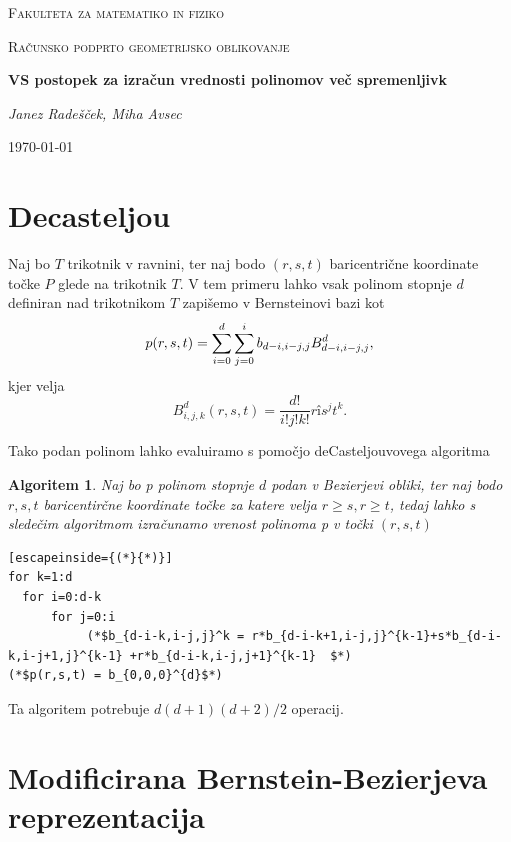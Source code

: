 \documentclass{article}
\newtheorem{algoritm}{Algoritem}[section]
\begin{document}
\begin{titlepage}
	\centering
	{\scshape\LARGE Fakulteta za matematiko in fiziko \par}
	\vspace{1cm}
	{\scshape\Large Računsko podprto geometrijsko oblikovanje\par}
	\vspace{1.5cm}
	{\huge\bfseries VS postopek za izračun vrednosti polinomov več spremenljivk\par}
	\vspace{2cm}
	{\Large\itshape Janez Radešček, Miha Avsec\par}
	\vfill

	\vfill

	{\large \today\par}
\end{titlepage}


\section{Decasteljou}

Naj bo $T$ trikotnik v ravnini, ter naj bodo $(r,s,t)$ baricentrične koordinate točke $P$ glede na trikotnik $T$. V tem primeru lahko vsak polinom stopnje $d$ definiran nad trikotnikom $T$ zapišemo v Bernsteinovi bazi kot
$$p(r,\\s,\\t) = \sum_{i=0}^{d}\sum_{j=0}^{i}b_{d-i,i-j,j}B_{d-i,i-j,j}^{d},$$
kjer velja
$$B_{i,j,k}^{d}(r,s,t) = \frac{d!}{i!j!k!}rîs^jt^k.$$

Tako podan polinom lahko evaluiramo s pomočjo deCasteljouvovega algoritma
\begin{algoritm}
Naj bo p polinom stopnje $d$ podan v Bezierjevi obliki, ter naj bodo $ r,s,t$ baricentirčne koordinate točke za katere velja $r \geq s,r \geq t$, tedaj lahko s sledečim algoritmom izračunamo vrenost polinoma p v točki $(r,s,t)$
\begin{lstlisting}[escapeinside={(*}{*)}]
for k=1:d
  for i=0:d-k
      for j=0:i
           (*$b_{d-i-k,i-j,j}^k = r*b_{d-i-k+1,i-j,j}^{k-1}+s*b_{d-i-k,i-j+1,j}^{k-1} +r*b_{d-i-k,i-j,j+1}^{k-1}  $*)
(*$p(r,s,t) = b_{0,0,0}^{d}$*)
\end{lstlisting}
\end{algoritm}

Ta algoritem potrebuje $d(d+1)(d+2)/2$ operacij.




\section{Modificirana Bernstein-Bezierjeva reprezentacija}
\end{document}
